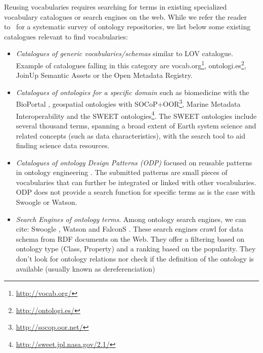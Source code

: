 \documentclass{iosart2c}
\begin{document}
Reusing vocabularies requires searching for terms in existing specialized vocabulary catalogues or search engines on the web. While we refer the reader to~\cite{AquinJoWS12} for a systematic survey of ontology repositories, we list below some existing catalogues relevant to find vocabularies:
\begin{itemize}
 \item \textit{Catalogues of generic vocabularies/schemas} similar to LOV catalogue. Example of catalogues falling in this category are vocab.org\footnote{\url{http://vocab.org/}}, ontologi.es\footnote{\url{http://ontologi.es/}}, JoinUp Semantic Assets or the Open Metadata Registry.
 \item \textit{Catalogues of ontologies for a specific domain} such as biomedicine with the BioPortal \cite{bioportal11}, geospatial ontologies with SOCoP+OOR\footnote{\url{http://socop.oor.net/}}, Marine Metadata Interoperability and the SWEET \cite{sweet05} ontologies\footnote{\url{http://sweet.jpl.nasa.gov/2.1/}}. The SWEET ontologies include several thousand terms, spanning a broad extent of Earth system science and related concepts (such as data characteristics), with the search tool to aid finding science data resources. 
 \item \textit{Catalogues of ontology Design Patterns (ODP)} focused on reusable patterns in ontology engineering \cite{presutti08}. The submitted patterns are small pieces of vocabularies that can further be integrated or linked with other vocabularies. ODP does not provide a search function for specific terms as is the case with Swoogle or Watson.
 \item \textit{Search Engines of ontology terms}. Among ontology search engines, we can cite: Swoogle \cite{finin2005swoogle}, Watson \cite{d2007watson,Sabou07} and FalconS \cite{cheng2008falcons}. These search engines crawl for data schema from RDF documents on the Web. They offer a filtering based on ontology type (Class, Property) and a ranking based on the popularity. They don't look for ontology relations nor check if the definition of the ontology is available (usually known as dereferenciation)
\end{itemize}
\end{document}
